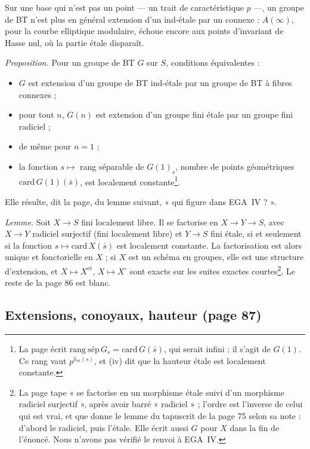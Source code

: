 \documentclass[11pt,a4paper]{article}
\begin{document}
Sur une base qui n'est pas un point — un trait de caractéristique $p$ —,
un groupe de BT n'est plus en général extension d'un ind-étale par un
connexe : $A(\infty)$, pour la courbe elliptique modulaire, échoue encore
aux points d'invariant de Hasse nul, où la partie étale disparaît.

\emph{Proposition.} Pour un groupe de BT $G$ sur $S$, conditions
équivalentes :
\begin{itemize}
  \item[(i)] $G$ est extension d'un groupe de BT ind-étale par un groupe
  de BT à fibres connexes ;
  \item[(ii)] pour tout $n$, $G(n)$ est extension d'un groupe fini étale
  par un groupe fini radiciel ;
  \item[(iii)] de même pour $n = 1$ ;
  \item[(iv)] la fonction $s \mapsto$ rang séparable de $G(1)_s$, nombre de
  points géométriques $\mathrm{card}\, G(1)(\bar s)$, est localement
  constante\footnote{La page écrit $\mathrm{rang\ sép}\, G_s =
  \mathrm{card}\, G(\bar s)$, qui serait infini ; il s'agit de $G(1)$.
  Ce rang vaut $p^{h_{\mathrm{et}}(s)}$, et (iv) dit que la hauteur étale
  est localement constante.}.
\end{itemize}
Elle résulte, dit la page, du lemme suivant, « qui figure dans EGA~IV ? ».

\emph{Lemme.} Soit $X \to S$ fini localement libre. Il se factorise en
$X \to Y \to S$, avec $X \to Y$ radiciel surjectif (fini localement libre)
et $Y \to S$ fini étale, si et seulement si la fonction
$s \mapsto \mathrm{card}\, X(\bar s)$ est localement constante. La
factorisation est alors unique et fonctorielle en $X$ ; si $X$ est un
schéma en groupes, elle est une structure d'extension, et $X \mapsto
X^{\mathrm{et}}$, $X \mapsto X^{\circ}$ sont exacts sur les suites exactes
courtes\footnote{La page tape « se factorise en un morphisme étale suivi
d'un morphisme radiciel surjectif », après avoir barré « radiciel » ;
l'ordre est l'inverse de celui qui est vrai, et que donne le lemme du
tapuscrit de la page 75 selon sa note : d'abord le radiciel, puis l'étale.
Elle écrit aussi $G$ pour $X$ dans la fin de l'énoncé. Nous n'avons pas
vérifié le renvoi à EGA~IV.}. Le reste de la page 86 est blanc.

\subsection*{Extensions, conoyaux, hauteur (page 87)}
\end{document}
